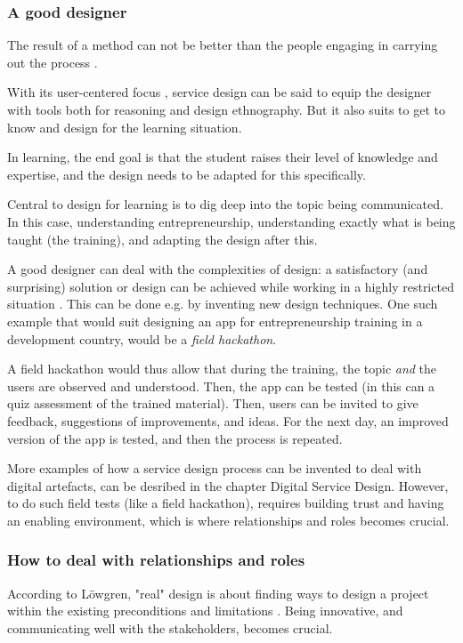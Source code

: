\subsubsection{A good designer}

The result of a method can not be better than the people engaging in carrying out the process \cite{lowgren}.

With its user-centered focus \cite{stickdorn}, service design can be said to equip the designer with tools both for reasoning and design ethnography. But it also suits to get to know and design for the learning situation.

In learning, the end goal is that the student raises their level of knowledge and expertise, and the design needs to be adapted for this specifically.

Central to design for learning is to dig deep into the topic being communicated. In this case, understanding entrepreneurship, understanding exactly what is being taught (the training), and adapting the design after this.

A good designer can deal with the complexities of design: a satisfactory (and surprising) solution or design can be achieved while working in a highly restricted situation \cite{lowgren}. This can be done e.g. by inventing new design techniques. One such example that would suit designing an app for entrepreneurship training in a development country, would be a \textit{field hackathon}.

A field hackathon would thus allow that during the training, the topic \textit{and} the users are observed and understood. Then, the app can be tested (in this can a quiz assessment of the trained material). Then, users can be invited to give feedback, suggestions of improvements, and  ideas. For the next day, an improved version of the app is tested, and then the process is repeated.

More examples of how a service design process can be invented to deal with digital artefacts, can be desribed in the chapter Digital Service Design. However, to do such field tests (like a field hackathon), requires building trust and having an enabling environment, which is where relationships and roles becomes crucial.

\subsubsection{How to deal with relationships and roles}
According to Löwgren, "real" design is about finding ways to design a project within the existing preconditions and limitations \cite{lowgren}. Being innovative, and communicating well with the stakeholders, becomes crucial.

